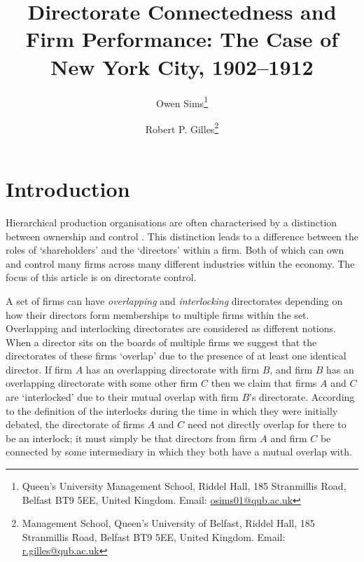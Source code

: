 \documentclass[11pt,fleqn]{article}
\begin{document}
\author{Owen Sims\thanks{Queen's University Management School, Riddel Hall, 185 Stranmillis Road, Belfast BT9 5EE, United Kingdom. \textsf{Email: \href{mailto:osims01@qub.ac.uk}{osims01@qub.ac.uk}}} \and Robert P. Gilles\thanks{Management School, Queen's University of Belfast, Riddel Hall, 185 Stranmillis Road, Belfast BT9 5EE, United Kingdom. \textsf{Email: \href{mailto:r.gilles@qub.ac.uk}{r.gilles@qub.ac.uk}}}}

\title{\textbf{Directorate Connectedness and Firm Performance: The Case of New York City, 1902--1912}}



\maketitle

\setcounter{page}{1} 

\section{Introduction}

Hierarchical production organisations are often characterised by a distinction between ownership and control \citep{JensenMeckling1976, FamaJensen1983}. This distinction leads to a difference between the roles of `shareholders' and the `directors' within a firm. Both of which can own and control many firms across many different industries within the economy. The focus of this article is on directorate control. 

A set of firms can have \emph{overlapping} and \emph{interlocking} directorates depending on how their directors form memberships to multiple firms within the set. Overlapping and interlocking directorates are considered as different notions. When a director sits on the boards of multiple firms we suggest that the directorates of these firms `overlap' due to the presence of at least one identical director. If firm $A$ has an overlapping directorate with firm $B$, and firm $B$ has an overlapping directorate with some other firm $C$ then we claim that firms $A$ and $C$ are `interlocked' due to their mutual overlap with firm $B$'s directorate. According to the definition of the interlocks during the time in which they were initially debated, the directorate of firms $A$ and $C$ need not directly overlap for there to be an interlock; it must simply be that directors from firm $A$ and firm $C$ be connected by some intermediary in which they both have a mutual overlap with. 
\end{document}
